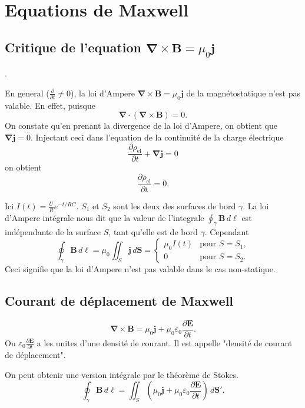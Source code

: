 \chapter{Equations de Maxwell}

\section{Critique de l'equation \texorpdfstring{$\boldsymbol{\nabla}\times \boldsymbol{B}=\mu _{0}\boldsymbol{j}$}{d'Ampere}}.

En general ($\frac{ \partial  }{ \partial t }\neq 0$), la loi d'Ampere $\boldsymbol{\nabla}\times \boldsymbol{B}=\mu_{0}\boldsymbol{j}$ de la magnétostatique n'est pas valable. En effet, puisque
$$
\boldsymbol{\nabla}\cdot(\boldsymbol{\nabla}\times \boldsymbol{B})=0.
$$
On constate qu'en prenant la divergence de la loi d'Ampere, on obtient que $\boldsymbol{\nabla}\boldsymbol{j}=0$. Injectant ceci dans l'equation de la continuité de la charge électrique 
$$
\frac{ \partial \rho _{\mathrm{el}} }{ \partial t } +\boldsymbol{\nabla j}=0
$$
on obtient
$$
\frac{ \partial \rho _{\mathrm{el}} }{ \partial t } =0.
$$
\begin{example}
Ici $I(t)=\frac{U}{R}e^{ -t/RC }$. $S_{1}$ et $S_{2}$ sont les deux des surfaces de bord $\gamma$. La loi d'Ampere intégrale nous dit que la valeur de l'integrale $\oint _{\gamma}\boldsymbol{B}\,d\boldsymbol{\ell}$ est indépendante de la surface $S$, tant qu'elle est de bord $\gamma$. Cependant
$$
\oint _{\gamma}\boldsymbol{B}\,d\boldsymbol{\ell}=\mu_{0}\iint _{S}\boldsymbol{j}\,d\boldsymbol{S}=\begin{cases}
\mu_{0}I(t) & \text{pour }S=S_{1}, \\
0 & \text{pour }S=S_{2}.
\end{cases}
$$
Ceci signifie que la loi d'Ampere n'est pas valable dans le cas non-statique.
\end{example}
\section{Courant de déplacement de Maxwell}

\begin{theorem}
$$
\boldsymbol{\nabla}\times \boldsymbol{B}=\mu_{0}\boldsymbol{j}+\mu_{0}\varepsilon_{0}\frac{ \partial \boldsymbol{E} }{ \partial t } .
$$
Ou $\varepsilon_{0}\frac{ \partial \boldsymbol{E} }{ \partial t }$ a les unites d'une densité de courant. Il est appelle "densité de courant de déplacement".
\end{theorem}
\begin{theorem}
On peut obtenir une version intégrale par le théorème de Stokes.
$$
\oint _{\gamma}\boldsymbol{B}\,d\boldsymbol{\ell}=\iint _{S}\left( \mu_{0}\boldsymbol{j}+\mu_{0}\varepsilon _{0}\frac{ \partial \boldsymbol{E} }{ \partial t }  \right)\,d\boldsymbol{S}'.
$$
\end{theorem}
